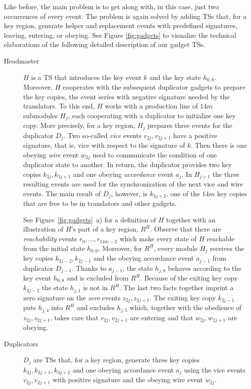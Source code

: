 \documentclass[english]{lipics_hacked}
\begin{document}
Like before, the main problem is to get along with, in this case, just two occurrences of every event.
The problem is again solved by adding TSs that, for a key region, generate helper and replacement events with predefined signatures, leaving, entering, or obeying.
See Figure \ref{fig:gadgets} to visualize the technical elaborations of the following detailed description of our gadget TSs. 
%
\begin{description}
%
\item[Headmaster]
$H$ is a TS that introduces the key event $k$ and the key state $h_{0,8}$.
Moreover, $H$ cooperates with the subsequent duplicator gadgets to prepare the key copies, the event series with negative signature needed by the translators.
To this end, $H$ works with a production line of $14m$ submodules $H_j$, each cooperating with a duplicator to initialize one key copy.
More precisely, for a key region, $H_j$ prepares three events for the duplicator $D_j$.
Two so-called \emph{vice} events $v_{2j}, v_{2j+1}$ have a positive signature, that is, vice with respect to the signature of $k$.
Then there is one obeying \emph{wire} event $w_{2j}$ used to communicate the condition of one duplicator state to another.
In return, the duplicator provides two key copies $k_{3j}, k_{3j+1}$ and one obeying \emph{accordance} event $a_j$.
In $H_{j+1}$ the three resulting events are used for the synchronization of the next vice and wire events.
The main result of $D_j$, however, is $k_{3j+2}$, one of the $14m$ key copies that are free to be in translators and other gadgets.

See Figure~\ref{fig:gadgets}~a) for a definition of $H$ together with an illustration of $H$'s part of a key region, $R^H$.
Observe that there are \emph{reachability} events $r_0, \dots, r_{14m-2}$ which make every state of $H$ reachable from the initial state $h_{0,0}$.
Moreover, for $R^H$, every module $H_j$ receives the key copies $k_{2j-2}, k_{2j-1}$ and the obeying accordance event $a_{j-1}$ from duplicator $D_{j-1}$.
Thanks to $a_{j-1}$, the state $h_{j,8}$ behaves according to the key event $h_{0,8}$ and is excluded from $R^H$.
Because of the exiting key copy $k_{2j-2}$ the state $h_{j,1}$ is not in $R^H$.
The last two facts together imprint a zero signature on the \emph{zero} events $z_{2j}, z_{2j+1}$.
The exiting key copy $k_{2j-1}$ puts $h_{j,4}$ into $R^H$ and excludes $h_{j,5}$ which, together with the obedience of $z_{2j}, z_{2j+1}$, takes care that $v_{2j},v_{2j+1}$ are entering and that $w_{2j}, w_{2j+1}$ are obeying.
%
\item[Duplicators]
$D_j$ are TSs that, for a key region, generate three key copies $k_{3j}, k_{3j+1}, k_{3j+2}$ and one obeying accordance event $a_j$ using the vice events $v_{2j}, v_{2j+1}$ with positive signature and the obeying wire event $w_{2j}$.


\end{description}
\end{document}
